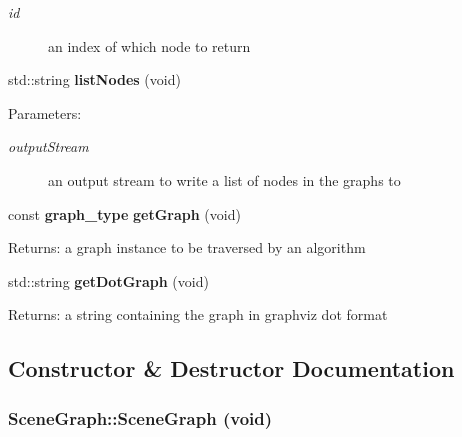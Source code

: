 \begin{CompactItemize}
\begin{CompactList}
\begin{Desc}
\begin{description}
\item[{\em id}]an index of which node to return \end{description}
\end{Desc}
\item\end{CompactList}\item 
std::string {\bf listNodes} (void)
\begin{CompactList}\small\item\em \begin{Desc}
\item[Parameters:]
\begin{description}
\item[{\em outputStream}]an output stream to write a list of nodes in the graphs to \end{description}
\end{Desc}
\item\end{CompactList}\item 
const {\bf graph\_\-type} {\bf getGraph} (void)
\begin{CompactList}\small\item\em \begin{Desc}
\item[Returns:]a graph instance to be traversed by an algorithm \end{Desc}
\item\end{CompactList}\item 
std::string {\bf getDotGraph} (void)
\begin{CompactList}\small\item\em \begin{Desc}
\item[Returns:]a string containing the graph in graphviz dot format \end{Desc}
\item\end{CompactList}\end{CompactItemize}


\subsection{Constructor \& Destructor Documentation}
\subsubsection{\setlength{\rightskip}{0pt plus 5cm}SceneGraph::SceneGraph (void)}\label{classSceneGraph_cd0ba5e308f0d5b54d95522318274579}


